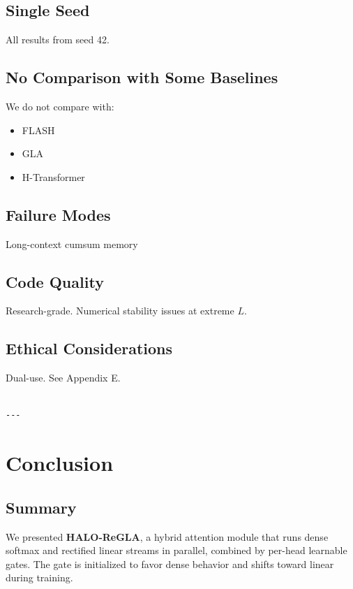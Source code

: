 \subsection{Single Seed}

All results from seed 42.

\subsection{No Comparison with Some Baselines}

We do not compare with:
\begin{itemize}
\item FLASH
\item GLA
\item H-Transformer

\end{itemize}
\subsection{Failure Modes}

Long-context cumsum memory

\subsection{Code Quality}

Research-grade. Numerical stability issues at extreme $L$.

\subsection{Ethical Considerations}

Dual-use. See Appendix E.
\begin{lstlisting}

---
\end{lstlisting}


\section{Conclusion}

\subsection{Summary}

We presented \textbf{HALO-ReGLA}, a hybrid attention module that runs dense 
softmax and rectified linear streams in parallel, combined by per-head 
learnable gates. The gate is initialized to favor dense behavior and shifts 
toward linear during training.

